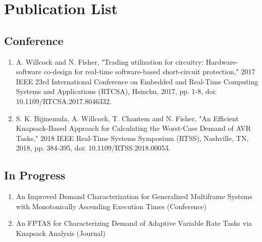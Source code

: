 \section{Publication List}   \label{chap:publicationList}

\subsection{Conference}

\begin{enumerate}
    \item A. Willcock and N. Fisher, "Trading utilization for circuitry: Hardware-software co-design for real-time software-based short-circuit protection," 2017 IEEE 23rd International Conference on Embedded and Real-Time Computing Systems and Applications (RTCSA), Hsinchu, 2017, pp. 1-8, doi: 10.1109/RTCSA.2017.8046332. \cite{willcock_trading_2017}
    \item S. K. Bijinemula, A. Willcock, T. Chantem and N. Fisher, "An Efficient Knapsack-Based Approach for Calculating the Worst-Case Demand of AVR Tasks," 2018 IEEE Real-Time Systems Symposium (RTSS), Nashville, TN, 2018, pp. 384-395, doi: 10.1109/RTSS.2018.00053. \cite{bijinemula_efficient_2019}
\end{enumerate}

\subsection{In Progress}

\begin{enumerate}
    \item An Improved Demand Characterization for Generalized Multiframe Systems with Monotonically Ascending Execution Times (Conference)
    \item An FPTAS for Characterizing Demand of Adaptive Variable Rate Tasks via Knapsack Analysis (Journal)
\end{enumerate}